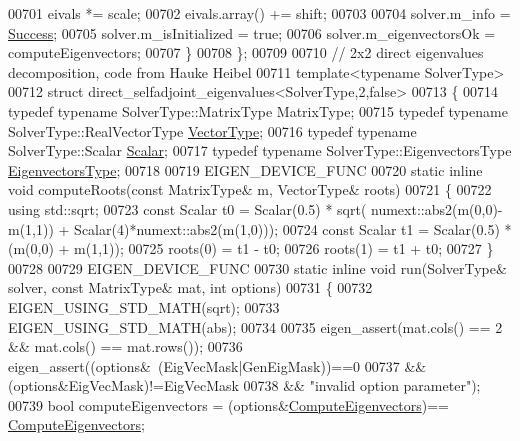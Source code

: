 \begin{DoxyCode}
00701     eivals *= scale;
00702     eivals.array() += shift;
00703     
00704     solver.m\_info = \hyperlink{group__enums_gga85fad7b87587764e5cf6b513a9e0ee5ea52581b035f4b59c203b8ff999ef5fcea}{Success};
00705     solver.m\_isInitialized = \textcolor{keyword}{true};
00706     solver.m\_eigenvectorsOk = computeEigenvectors;
00707   \}
00708 \};
00709 
00710 \textcolor{comment}{// 2x2 direct eigenvalues decomposition, code from Hauke Heibel}
00711 \textcolor{keyword}{template}<\textcolor{keyword}{typename} SolverType> 
00712 \textcolor{keyword}{struct }direct\_selfadjoint\_eigenvalues<SolverType,2,false>
00713 \{
00714   \textcolor{keyword}{typedef} \textcolor{keyword}{typename} SolverType::MatrixType MatrixType;
00715   \textcolor{keyword}{typedef} \textcolor{keyword}{typename} SolverType::RealVectorType \hyperlink{struct_vector_type}{VectorType};
00716   \textcolor{keyword}{typedef} \textcolor{keyword}{typename} SolverType::Scalar \hyperlink{group___eigenvalues___module_a0bfcedf4245b6846007ca4f01e4feb1f}{Scalar};
00717   \textcolor{keyword}{typedef} \textcolor{keyword}{typename} SolverType::EigenvectorsType \hyperlink{group___core___module}{EigenvectorsType};
00718   
00719   EIGEN\_DEVICE\_FUNC
00720   \textcolor{keyword}{static} \textcolor{keyword}{inline} \textcolor{keywordtype}{void} computeRoots(\textcolor{keyword}{const} MatrixType& m, VectorType& roots)
00721   \{
00722     \textcolor{keyword}{using} std::sqrt;
00723     \textcolor{keyword}{const} Scalar t0 = Scalar(0.5) * sqrt( numext::abs2(m(0,0)-m(1,1)) + Scalar(4)*numext::abs2(m(1,0)));
00724     \textcolor{keyword}{const} Scalar t1 = Scalar(0.5) * (m(0,0) + m(1,1));
00725     roots(0) = t1 - t0;
00726     roots(1) = t1 + t0;
00727   \}
00728   
00729   EIGEN\_DEVICE\_FUNC
00730   \textcolor{keyword}{static} \textcolor{keyword}{inline} \textcolor{keywordtype}{void} run(SolverType& solver, \textcolor{keyword}{const} MatrixType& mat, \textcolor{keywordtype}{int} options)
00731   \{
00732     EIGEN\_USING\_STD\_MATH(sqrt);
00733     EIGEN\_USING\_STD\_MATH(abs);
00734     
00735     eigen\_assert(mat.cols() == 2 && mat.cols() == mat.rows());
00736     eigen\_assert((options&~(EigVecMask|GenEigMask))==0
00737             && (options&EigVecMask)!=EigVecMask
00738             && \textcolor{stringliteral}{"invalid option parameter"});
00739     \textcolor{keywordtype}{bool} computeEigenvectors = (options&\hyperlink{group__enums_ggae3e239fb70022eb8747994cf5d68b4a9ada93d8885bde32b876ba4af01d3292cc}{ComputeEigenvectors})==
      \hyperlink{group__enums_ggae3e239fb70022eb8747994cf5d68b4a9ada93d8885bde32b876ba4af01d3292cc}{ComputeEigenvectors};

\end{DoxyCode}
